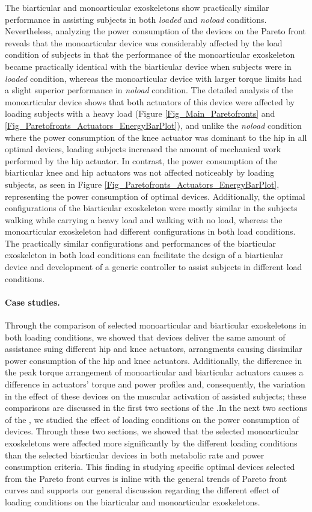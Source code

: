 \documentclass[10pt,letterpaper]{article}
\begin{document}
The biarticular and monoarticular exoskeletons show practically similar performance in assisting subjects in both {\it loaded} and {\it noload} conditions. Nevertheless, analyzing the power consumption of the devices on the Pareto front reveals that the monoarticular device was considerably affected by the load condition of subjects in that the performance of the monoarticular exoskeleton became practically identical with the biarticular device when subjects were in \textit{loaded} condition, whereas the monoarticular device with larger torque limits had a slight superior performance in \textit{noload} condition.
The detailed analysis of the monoarticular device shows that both actuators of this device were affected by loading subjects with a heavy load (Figure \ref{Fig_Main_Paretofronts} and \ref{Fig_Paretofronts_Actuators_EnergyBarPlot}), and unlike the \textit{noload} condition where the power consumption of the knee actuator was dominant to the hip in all optimal devices, loading subjects increased the amount of mechanical work performed by the hip actuator. In contrast, the power consumption of the biarticular knee and hip actuators was not affected noticeably by loading subjects, as seen in Figure \ref{Fig_Paretofronts_Actuators_EnergyBarPlot}, representing the power consumption of optimal devices. Additionally, the optimal configurations of the biarticular exoskeleton were mostly similar in the subjects walking while carrying a heavy load and walking with no load, whereas the monoarticular exoskeleton had different configurations in both load conditions. The practically similar configurations and performances of the biarticular exoskeleton in both load conditions can facilitate the design of a biarticular device and development of a generic controller to assist subjects in different load conditions.\\
\paragraph*{Case studies.} Through the comparison of selected monoarticular and biarticular exoskeletons in both loading conditions, we showed that devices deliver the same amount of assistance suing different hip and knee actuators, arrangments causing dissimilar power consumption of the hip and knee actuators. Additionally, the difference in the peak torque arrangement of monoarticular and biarticular actuators causes a difference in actuators' torque and power profiles and, consequently, the variation in the effect of these devices on the muscular activation of assisted subjects; these comparisons are discussed in the first two sections of the .In the next two sections of the , we studied the effect of loading conditions on the power consumption of devices. Through these two sections, we showed that the selected monoarticular exoskeletons were affected more significantly by the different loading conditions than the selected biarticular devices in both metabolic rate and power consumption criteria. This finding in studying specific optimal devices selected from the Pareto front curves is inline with the general trends of Pareto front curves and supports our general discussion regarding the different effect of loading conditions on the biarticular and monoarticular exoskeletons.
\end{document}
